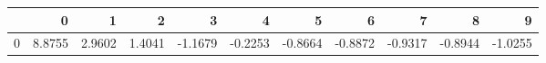 \begin{tabular}{lrrrrrrrrrr}
\toprule
{} &       0 &       1 &       2 &       3 &       4 &       5 &       6 &       7 &       8 &       9 \\
\midrule
0 &  8.8755 &  2.9602 &  1.4041 & -1.1679 & -0.2253 & -0.8664 & -0.8872 & -0.9317 & -0.8944 & -1.0255 \\
\bottomrule
\end{tabular}
